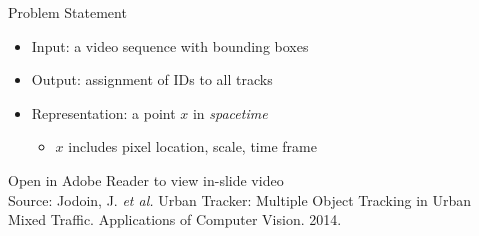 \documentclass[aspectratio=43]{beamer}
\begin{document}
		
		\begin{frame}{Problem Statement}
			\begin{itemize}
				\item Input: a video sequence with bounding boxes
				\item Output: assignment of IDs to all tracks
				\item Representation: a point $x$ in \textit{spacetime}
				\begin{itemize}
					\item $x$ includes pixel location, scale, time frame
				\end{itemize}
			\end{itemize}
			\begin{center}
			\end{center}
			\vfill
			{\fontsize{4}{12} \selectfont 
				Open in Adobe Reader to view in-slide video \\ \vspace{-2.7mm}
				Source: Jodoin, J. \textit{et al.} Urban Tracker: Multiple Object Tracking in Urban Mixed Traffic. Applications of Computer Vision. 2014.
			}
		\end{frame}
		
\end{document}

